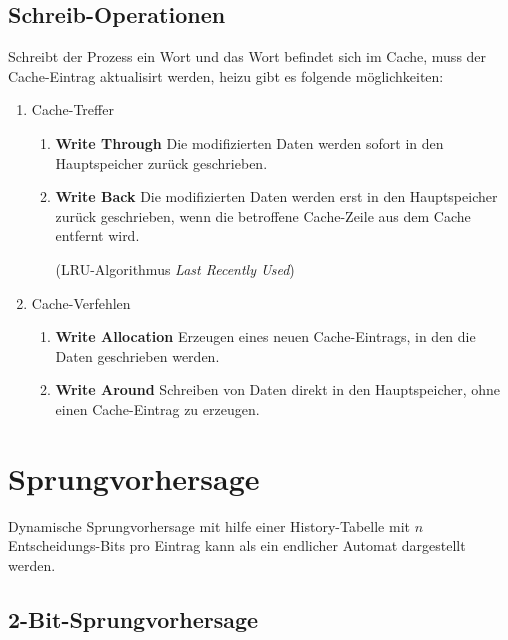 \documentclass
[
	8pt,		%
	ngerman,	%
	a4paper,	%
	landscape,	%
	final		%
]{extarticle}
\begin{document}
\begin{multicols*}{4}
\subsection{Schreib-Operationen}
Schreibt der Prozess ein Wort und das Wort befindet sich im Cache, muss der
Cache-Eintrag aktualisirt werden, heizu gibt es folgende möglichkeiten:
\begin{enumerate}
	\item Cache-Treffer
	      \begin{enumerate}
		      \item\textbf{Write Through} Die modifizierten Daten werden
		            sofort in den Hauptspeicher zurück geschrieben.
		      \item\textbf{Write Back} Die modifizierten Daten werden erst
		            in den Hauptspeicher zurück geschrieben,
		            wenn die betroffene Cache-Zeile aus dem Cache entfernt
		            wird.\par (LRU-Algorithmus \emph{Last Recently Used})
	      \end{enumerate}

	\item Cache-Verfehlen
	      \begin{enumerate}
		      \item\textbf{Write Allocation} Erzeugen eines neuen
		            Cache-Eintrags, in den die Daten geschrieben werden.
		      \item\textbf{Write Around} Schreiben von Daten direkt in den
		            Hauptspeicher, ohne einen Cache-Eintrag zu erzeugen.
	      \end{enumerate}
\end{enumerate}
\columnbreak
\section{Sprungvorhersage}
Dynamische Sprungvorhersage mit hilfe einer History-Tabelle mit \(n\)
Entscheidungs-Bits pro Eintrag kann als ein endlicher Automat dargestellt
werden.
\subsection{2-Bit-Sprungvorhersage}
\begin{center}
	
\end{center}

\end{multicols*}
\end{document}
